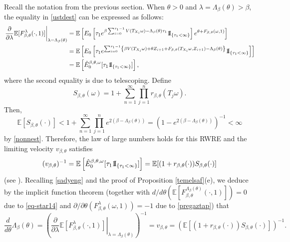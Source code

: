 \documentclass[a4paper]{amsart}
\numberwithin{equation}{section}
\theoremstyle{plain}
\theoremstyle{remark}
\begin{document}
Recall the notation from the previous section. When $\theta>0$ and $\lambda = \Lambda_\beta(\theta)>\beta$, the equality in \eqref{ustdest} can be expressed as follows:
\begin{align}
\left.\frac{\partial}{\partial\lambda}\mathbb{E}[F_{\beta,\theta}^\lambda(\cdot,1)]\right|_{\lambda = \Lambda_\beta(\theta)} &= \mathbb{E}\left[E_0\left[\tau_1e^{\beta\sum_{i=0}^{\tau_1-1}V(T_{X_i}\omega) - \Lambda_\beta(\theta)\tau_1}{{{\rm 1\mkern-1.5mu}\!{\rm I}}}_{\{\tau_1<\infty\}}\right]e^{\theta + F_{\beta,\theta}(\omega,1)}\right]\nonumber\\&= \mathbb{E}\left[E_0\left[\tau_1e^{\sum_{i=0}^{\tau_1-1}\left\{\beta V(T_{X_i}\omega) + \theta Z_{i+1} + F_{\beta,\theta}(T_{X_i}\omega,Z_{i+1}) - \Lambda_\beta(\theta)\right\}}{{{\rm 1\mkern-1.5mu}\!{\rm I}}}_{\{\tau_1<\infty\}}\right]\right]\nonumber\\
&=\mathbb{E}\left[\hat E_0^{\beta,\theta,\omega}[\tau_1{{{\rm 1\mkern-1.5mu}\!{\rm I}}}_{\{\tau_1<\infty\}}]\right],\label{sadyeng}
\end{align}
{}{where the second equality is due to telescoping.}
Define $$S_{\beta,\theta}(\omega) = 1 + \sum_{n=1}^\infty\prod_{j=1}^nr_{\beta,\theta}(T_j\omega).$$
Then,
$$\mathbb{E}[S_{\beta,\theta}(\cdot)] < 1+ \sum_{n=1}^\infty\prod_{j=1}^n e^{2(\beta - \Lambda_\beta(\theta))} = \left(1- e^{2(\beta - \Lambda_\beta(\theta))}\right)^{-1} < \infty$$
by \eqref{nonnest}. Therefore, the law of large numbers holds for this RWRE and the limiting velocity $v_{\beta,\theta}$ satisfies
$$(v_{\beta,\theta})^{-1} = \mathbb{E}\left[\hat E_0^{\beta,\theta,\omega}[\tau_1{{{\rm 1\mkern-1.5mu}\!{\rm I}}}_{\{\tau_1<\infty\}}]\right] = \mathbb{E}[(1 + r_{\beta,\theta}(\cdot))S_{\beta,\theta}(\cdot)]$$
(see \cite[Theorem 4.1]{Ali1999}). Recalling \eqref{sadyeng} and the proof of Proposition \ref{temelsaf}(e), we deduce by the implicit function theorem 
{}{(together with $d /d\theta\left(\mathbb{E}\left[
F_{\beta,\theta}^{\Lambda_\beta(\theta)}(\cdot,1)\right]\right)=0$ 
due to \eqref{eq-star14} and 
$\partial/\partial \theta (F_{\beta,\theta}^\lambda(\omega,1))=-1$ due to  
\eqref{pregaztap})} that
\begin{equation}\label{derengel}
\frac{d}{d\theta}\Lambda_\beta(\theta) = \left(\left.\frac{\partial}{\partial\lambda}\mathbb{E}[F_{\beta,\theta}^\lambda(\cdot,1)]\right|_{\lambda = \Lambda_\beta(\theta)}\right)^{-1} = v_{\beta,\theta} = \left(\mathbb{E}[(1 + r_{\beta,\theta}(\cdot))S_{\beta,\theta}(\cdot)]\right)^{-1}.
\end{equation}
\end{document}
